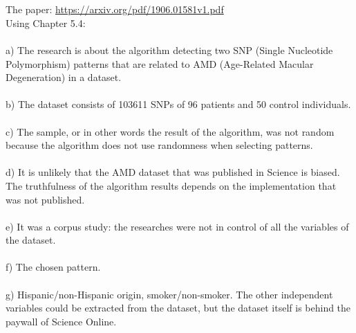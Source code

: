 \documentclass[a4paper,12pt]{article}
\newcommand{\<}{\langle}
\renewcommand{\>}{\rangle}
\newcommand{\1}{\mathbbm{1}}
\begin{document}
\section{}

\section{}

\section{}

\section{}

\section{}
The paper: \url{https://arxiv.org/pdf/1906.01581v1.pdf} \\
Using Chapter 5.4: \\\\
a) The research is about the algorithm detecting two SNP (Single Nucleotide Polymorphism) patterns that are related to AMD (Age-Related Macular Degeneration) in a dataset. \\\\
b) The dataset consists of 103611 SNPs of 96 patients and 50 control individuals. \\\\
c) The sample, or in other words the result of the algorithm, was not random because the algorithm does not use randomness when selecting patterns. \\\\
d) It is unlikely that the AMD dataset that was published in Science is biased. The truthfulness of the algorithm results depends on the implementation that was not published. \\\\
e) It was a corpus study: the researches were not in control of all the variables of the dataset. \\\\
f) The chosen pattern. \\\\
g) Hispanic/non-Hispanic origin, smoker/non-smoker. The other independent variables could be extracted from the dataset, but the dataset itself is behind the paywall of Science Online. \\\\
\end{document}
